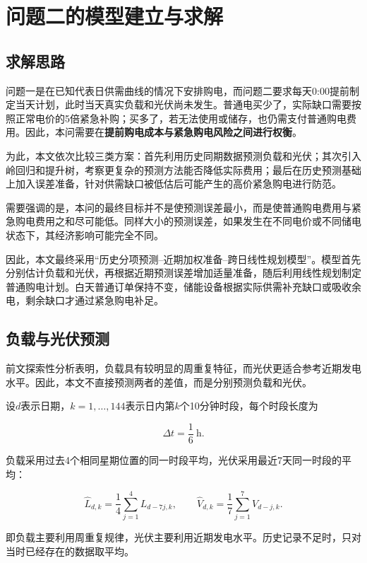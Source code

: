 \section{问题二的模型建立与求解}

\subsection{求解思路}

问题一是在已知代表日供需曲线的情况下安排购电，而问题二要求每天0:00提前制定当天计划，此时当天真实负载和光伏尚未发生。普通电买少了，实际缺口需要按照正常电价的5倍紧急补购；买多了，若无法使用或储存，也仍需支付普通购电费用。因此，本问需要在\textbf{提前购电成本与紧急购电风险之间进行权衡}。

为此，本文依次比较三类方案：首先利用历史同期数据预测负载和光伏；其次引入岭回归和提升树，考察更复杂的预测方法能否降低实际费用；最后在历史预测基础上加入误差准备，针对供需缺口被低估后可能产生的高价紧急购电进行防范。

需要强调的是，本问的最终目标并不是使预测误差最小，而是使普通购电费用与紧急购电费用之和尽可能低。同样大小的预测误差，如果发生在不同电价或不同储电状态下，其经济影响可能完全不同。

因此，本文最终采用“历史分项预测--近期加权准备--跨日线性规划模型”。模型首先分别估计负载和光伏，再根据近期预测误差增加适量准备，随后利用线性规划制定普通购电计划。白天普通订单保持不变，储能设备根据实际供需补充缺口或吸收余电，剩余缺口才通过紧急购电补足。


\subsection{负载与光伏预测}

前文探索性分析表明，负载具有较明显的周重复特征，而光伏更适合参考近期发电水平。因此，本文不直接预测两者的差值，而是分别预测负载和光伏。

设$d$表示日期，$k=1,\ldots,144$表示日内第$k$个10分钟时段，每个时段长度为

\[
\Delta t=\frac{1}{6}\ \mathrm{h}.
\]

负载采用过去4个相同星期位置的同一时段平均，光伏采用最近7天同一时段的平均：

\begin{equation}
\widehat L_{d,k}
=
\frac{1}{4}\sum_{j=1}^{4}L_{d-7j,k},
\qquad
\widehat V_{d,k}
=
\frac{1}{7}\sum_{j=1}^{7}V_{d-j,k}.
\label{eq:q2_forecast}
\end{equation}

即负载主要利用周重复规律，光伏主要利用近期发电水平。历史记录不足时，只对当时已经存在的数据取平均。

